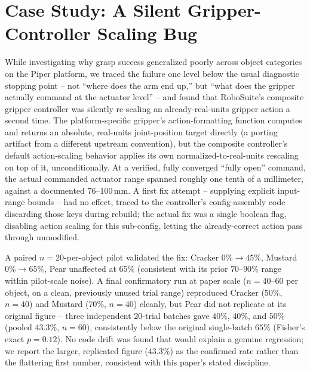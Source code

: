 \documentclass[journal]{IEEEtran}
\begin{document}
\section{Case Study: A Silent Gripper-Controller Scaling Bug}
\label{sec:gripperbug}

While investigating why grasp success generalized poorly across object
categories on the Piper platform, we traced the failure one level below
the usual diagnostic stopping point -- not ``where does the arm end up,''
but ``what does the gripper actually command at the actuator level'' --
and found that RoboSuite's composite gripper controller was silently
re-scaling an already-real-units gripper action a second time. The
platform-specific gripper's action-formatting function computes and
returns an absolute, real-units joint-position target directly (a
porting artifact from a different upstream convention), but the composite
controller's default action-scaling behavior applies its own
normalized-to-real-units rescaling on top of it, unconditionally. At a
verified, fully converged ``fully open'' command, the actual commanded
actuator range spanned roughly one tenth of a millimeter, against a
documented $76$--$100\,\mathrm{mm}$. A first fix attempt -- supplying
explicit input-range bounds -- had no effect, traced to the controller's
config-assembly code discarding those keys during rebuild; the actual fix
was a single boolean flag, disabling action scaling for this sub-config,
letting the already-correct action pass through unmodified.

A paired $n{=}20$-per-object pilot validated the fix: Cracker
$0\%\rightarrow45\%$, Mustard $0\%\rightarrow65\%$, Pear unaffected at
$65\%$ (consistent with its prior $70$--$90\%$ range within pilot-scale
noise). A final confirmatory run at paper scale ($n{=}40$--$60$ per
object, on a clean, previously unused trial range) reproduced Cracker
($50\%$, $n{=}40$) and Mustard ($70\%$, $n{=}40$) cleanly, but Pear did
not replicate at its original figure -- three independent 20-trial
batches gave $40\%$, $40\%$, and $50\%$ (pooled $43.3\%$, $n{=}60$),
consistently below the original single-batch $65\%$ (Fisher's exact
$p{=}0.12$). No code drift was found that would explain a genuine
regression; we report the larger, replicated figure ($43.3\%$) as the
confirmed rate rather than the flattering first number, consistent with
this paper's stated discipline.

\end{document}
